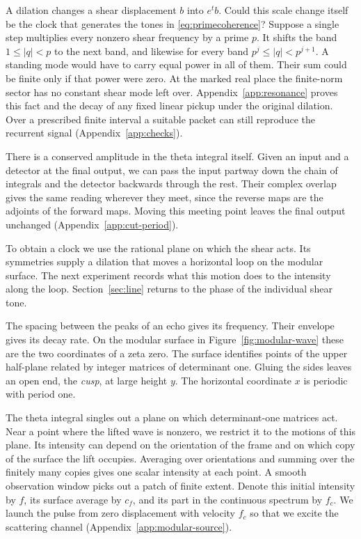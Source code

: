 \documentclass[11pt,letterpaper]{article}
\makeatletter
\renewcommand\section{\@startsection{section}{1}{\z@}{-3.1ex plus -.6ex minus -.2ex}{1.25ex plus .2ex}{\normalfont\large\bfseries}}
\numberwithin{equation}{section}
\makeatother
\begin{document}
A dilation changes a shear displacement $b$ into $e^t b$. Could this scale change itself be the clock that generates the tones in \eqref{eq:primecoherence}? Suppose a single step multiplies every nonzero shear frequency by a prime $p$. It shifts the band $1\le |q|<p$ to the next band, and likewise for every band $p^j\le |q|<p^{j+1}$. A standing mode would have to carry equal power in all of them. Their sum could be finite only if that power were zero. At the marked real place the finite-norm sector has no constant shear mode left over. Appendix~\ref{app:resonance} proves this fact and the decay of any fixed linear pickup under the original dilation. Over a prescribed finite interval a suitable packet can still reproduce the recurrent signal (Appendix~\ref{app:checks}).

There is a conserved amplitude in the theta integral itself. Given an input and a detector at the final output, we can pass the input partway down the chain of integrals and the detector backwards through the rest. Their complex overlap gives the same reading wherever they meet, since the reverse maps are the adjoints of the forward maps. Moving this meeting point leaves the final output unchanged (Appendix~\ref{app:cut-period}).

To obtain a clock we use the rational plane on which the shear acts. Its symmetries supply a dilation that moves a horizontal loop on the modular surface. The next experiment records what this motion does to the intensity along the loop. Section~\ref{sec:line} returns to the phase of the individual shear tone.

\section{What decays on the modular surface}\label{sec:cusp}

The spacing between the peaks of an echo gives its frequency. Their envelope gives its decay rate. On the modular surface in Figure~\ref{fig:modular-wave} these are the two coordinates of a zeta zero. The surface identifies points of the upper half-plane related by integer matrices of determinant one. Gluing the sides leaves an open end, the \emph{cusp}, at large height $y$. The horizontal coordinate $x$ is periodic with period one.

The theta integral singles out a plane on which determinant-one matrices act. Near a point where the lifted wave is nonzero, we restrict it to the motions of this plane. Its intensity can depend on the orientation of the frame and on which copy of the surface the lift occupies. Averaging over orientations and summing over the finitely many copies gives one scalar intensity at each point. A smooth observation window picks out a patch of finite extent. Denote this initial intensity by $f$, its surface average by $c_f$, and its part in the continuous spectrum by $f_c$. We launch the pulse from zero displacement with velocity $f_c$ so that we excite the scattering channel (Appendix~\ref{app:modular-source}).
\end{document}
